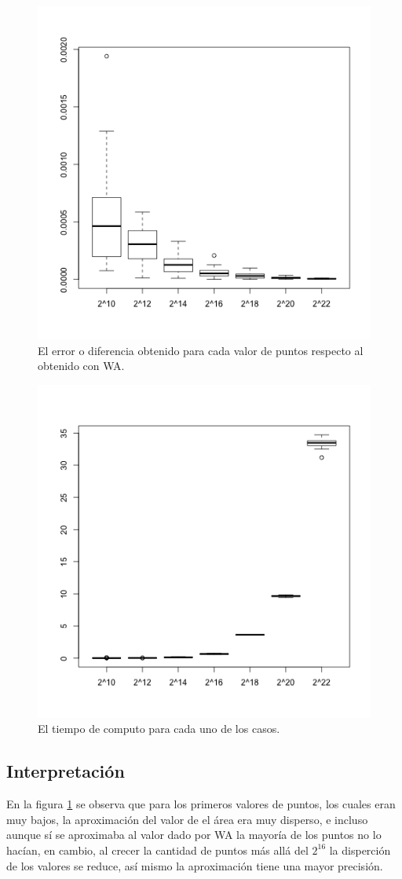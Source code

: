 \documentclass[a4paper]{article}
\begin{document}
\begin{figure}[!]
\centering
\includegraphics[width=0.7\linewidth]{error}
\caption{El error o diferencia obtenido para cada valor de puntos respecto al obtenido con WA.}
\label{fig:error}
\end{figure}

\begin{figure}[!]
\centering
\includegraphics[width=0.7\linewidth]{tiempos}
\caption{El tiempo de computo para cada uno de los casos.}
\label{fig:tiempos}
\end{figure}


\subsection{Interpretación}
En la figura \ref{fig:error} se observa que para los primeros valores de puntos, los cuales eran muy bajos, la aproximación del valor de el área era muy disperso, e incluso aunque sí se aproximaba al valor dado por WA la mayoría de los puntos no lo hacían, en cambio, al crecer la cantidad de puntos más allá del $2^{16}$ la disperción de los valores se reduce, así mismo la aproximación tiene una mayor precisión.
\end{document}
